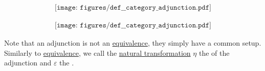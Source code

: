 \begin{definition}
\begin{thmenum}
    \begin{minipage}{0.43\textwidth}
      \begin{equation}\label{eq:def:category_adjunction/f}
        \begin{aligned}
          \texttt{[image: figures/def\_\_category\_adjunction.pdf]}
        \end{aligned}
      \end{equation}
    \end{minipage}
    \hfill
    \begin{minipage}{0.44\textwidth}
      \raggedright
      \begin{equation}\label{eq:def:category_adjunction/g}
        \begin{aligned}
          \texttt{[image: figures/def\_\_category\_adjunction.pdf]}
        \end{aligned}
      \end{equation}
    \end{minipage}
    \smallskip

    Note that an adjunction is not an \hyperref[def:category_equivalence]{equivalence}, they simply have a common setup. Similarly to \hyperref[def:category_equivalence]{equivalence}, we call the \hyperref[def:natural_transformation]{natural transformation} \( \eta \) the  of the adjunction and \( \varepsilon \) the .
  \end{thmenum}
\end{definition}

